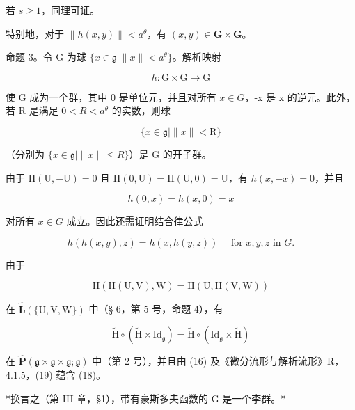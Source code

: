 若 \(s \geqslant 1\)，同理可证。

特别地，对于 \(\| h(x,y)\| < a^{\theta}\)，有 \((x,y)\in \mathbf{G}\times \mathbf{G}\)。

命题 3。令 G 为球 \(\{x\in\mathfrak{g}\mid\|x\|<a^{\theta}\}\)。解析映射

\[
h \colon \mathrm{G} \times \mathrm{G} \rightarrow \mathrm{G}
\]

使 G 成为一个群，其中 0 是单位元，并且对所有 \(x \in G\)，-x 是 x 的逆元。此外，若 R 是满足 \(0 < R < a^{\theta}\) 的实数，则球

\[
\{x \in \mathfrak {g} | \| x \| <   \mathrm{R} \}
\]

（分别为 \(\{x \in \mathfrak{g} \mid \|x\| \leqslant R\}\)）是 G 的开子群。

由于 \(\mathrm{H}(\mathrm{U}, -\mathrm{U}) = 0\) 且 \(\mathrm{H}(0, \mathrm{U}) = \mathrm{H}(\mathrm{U}, 0) = \mathrm{U}\)，有 \(h(x, -x) = 0\)，并且

\[
h (0, x) = h (x, 0) = x
\]

对所有 \(x \in G\) 成立。因此还需证明结合律公式

\[
h (h (x, y), z) = h (x, h (y, z)) \quad \text { for } x, y, z \text { in } G.\tag{18}
\]

由于

\[
\mathrm{H} (\mathrm{H} (\mathrm{U}, \mathrm{V}), \mathrm{W}) = \mathrm{H} (\mathrm{U}, \mathrm{H} (\mathrm{V}, \mathrm{W}))
\]

在 \(\hat{\mathbf{L}} (\{\mathrm{U},\mathrm{V},\mathrm{W}\})\) 中（§ 6，第 5 号，命题 4），有

\[
\tilde {\mathrm{H}} \circ (\tilde {\mathrm{H}} \times \mathrm{Id} _ {\mathfrak {g}}) = \tilde {\mathrm{H}} \circ (\mathrm{Id} _ {\mathfrak {g}} \times \tilde {\mathrm{H}})\tag{19}
\]

在 \(\hat{\mathbf{P}} (\mathfrak{g}\times \mathfrak{g}\times \mathfrak{g};\mathfrak{g})\) 中（第 2 号），并且由 (16) 及《微分流形与解析流形》R，4.1.5，(19) 蕴含 (18)。

*换言之（第 III 章，§1），带有豪斯多夫函数的 G 是一个李群。*

